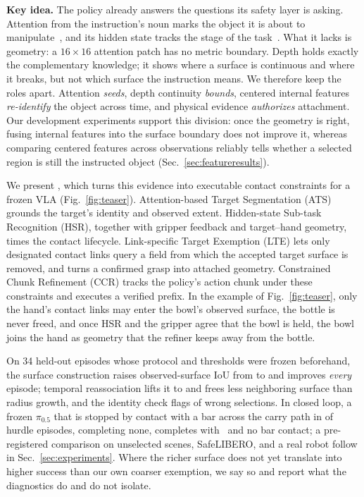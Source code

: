 \textbf{Key idea.} The policy already answers the questions its safety layer is asking. Attention from the instruction's noun marks the object it is about to manipulate~\cite{kang2025fewheads,park2026knows}, and its hidden state tracks the stage of the task~\cite{bhardwaj2026progress}. What it lacks is geometry: a $16\times16$ attention patch has no metric boundary. Depth holds exactly the complementary knowledge; it shows where a surface is continuous and where it breaks, but not which surface the instruction means. We therefore keep the roles apart. Attention \emph{seeds}, depth continuity \emph{bounds}, centered internal features \emph{re-identify} the object across time, and physical evidence \emph{authorizes} attachment. Our development experiments support this division: once the geometry is right, fusing internal features into the surface boundary does not improve it, whereas comparing centered features across observations reliably tells whether a selected region is still the instructed object (Sec.~\ref{sec:featureresults}).

We present \sys, which turns this evidence into executable contact constraints for a frozen VLA (Fig.~\ref{fig:teaser}). Attention-based Target Segmentation (ATS) grounds the target's identity and observed extent. Hidden-state Sub-task Recognition (HSR), together with gripper feedback and target--hand geometry, times the contact lifecycle. Link-specific Target Exemption (LTE) lets only designated contact links query a field from which the accepted target surface is removed, and turns a confirmed grasp into attached geometry. Constrained Chunk Refinement (CCR) tracks the policy's action chunk under these constraints and executes a verified prefix. In the example of Fig.~\ref{fig:teaser}, only the hand's contact links may enter the bowl's observed surface, the bottle is never freed, and once HSR and the gripper agree that the bowl is held, the bowl joins the hand as geometry that the refiner keeps away from the bottle.

On 34 held-out episodes whose protocol and thresholds were frozen beforehand, the surface construction raises observed-surface IoU from  to  and improves \emph{every} episode; temporal reassociation lifts it to  and frees  less neighboring surface than radius growth, and the identity check flags  of  wrong selections. In closed loop, a frozen $\pi_{0.5}$ that is stopped by contact with a bar across the carry path in  of  hurdle episodes, completing none, completes  with \sys\ and no bar contact; a pre-registered comparison on  unselected scenes, SafeLIBERO, and a real robot follow in Sec.~\ref{sec:experiments}. Where the richer surface does not yet translate into higher success than our own coarser exemption, we say so and report what the diagnostics do and do not isolate.

